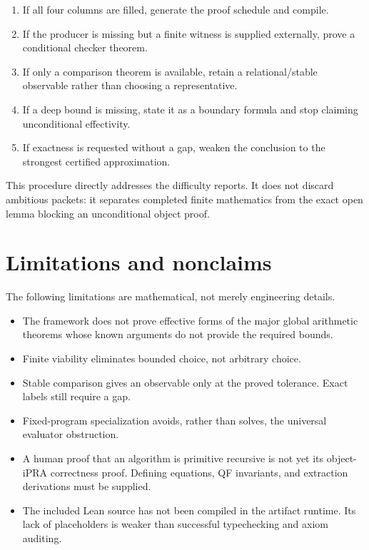 \documentclass[11pt]{article}
\begin{document}
\begin{enumerate}
\item If all four columns are filled, generate the proof schedule and compile.
\item If the producer is missing but a finite witness is supplied externally,
      prove a conditional checker theorem.
\item If only a comparison theorem is available, retain a relational/stable
      observable rather than choosing a representative.
\item If a deep bound is missing, state it as a boundary formula and stop
      claiming unconditional effectivity.
\item If exactness is requested without a gap, weaken the conclusion to the
      strongest certified approximation.
\end{enumerate}

This procedure directly addresses the difficulty reports.  It does not discard
ambitious packets: it separates completed finite mathematics from the exact
open lemma blocking an unconditional object proof.

\section{Limitations and nonclaims}

The following limitations are mathematical, not merely engineering details.

\begin{itemize}
\item The framework does not prove effective forms of the major global
      arithmetic theorems whose known arguments do not provide the required
      bounds.
\item Finite viability eliminates bounded choice, not arbitrary choice.
\item Stable comparison gives an observable only at the proved tolerance.
      Exact labels still require a gap.
\item Fixed-program specialization avoids, rather than solves, the universal
      evaluator obstruction.
\item A human proof that an algorithm is primitive recursive is not yet its
      object-iPRA correctness proof.  Defining equations, QF invariants, and
      extraction derivations must be supplied.
\item The included Lean source has not been compiled in the artifact runtime.
      Its lack of placeholders is weaker than successful typechecking and
      axiom auditing.
\end{itemize}
\end{document}

